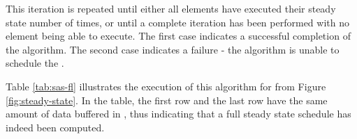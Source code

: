 This iteration is repeated until either all elements have executed
their steady state number of times, or until a complete iteration
has been performed with no element being able to execute. The
first case indicates a successful completion of the algorithm. The
second case indicates a failure - the algorithm is unable to
schedule the {\feedbackloop}.

Table \ref{tab:sas-fl} illustrates the execution of this algorithm
for {\feedbackloop} from Figure \ref{fig:steady-state}. In the
table, the first row and the last row have the same amount of data
buffered in {{\Channels}}, thus indicating that a full steady
state schedule has indeed been computed.
\begin{comment}
Furthermore, the last entry considering execution of $B$ has
sufficient data to execute $B$ 5 times, but only executes it 4
times to ensure that a steady state schedule is constructed.
\end{comment}

